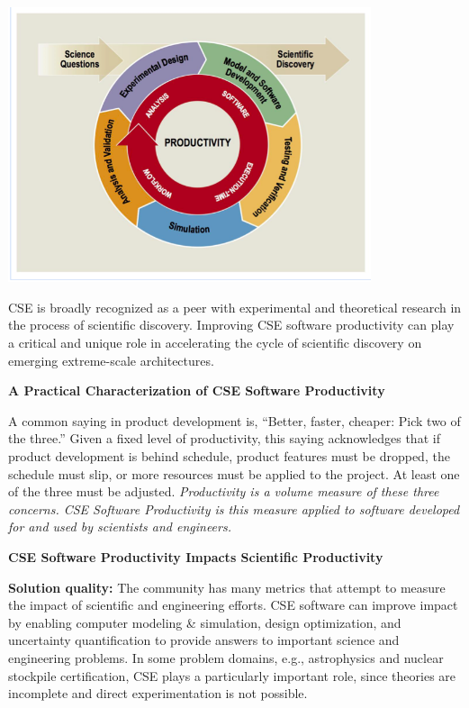 \documentclass[]{article}
\begin{document}
\begin{minipage}{0.7\textwidth}
\includegraphics[width=0.8\textwidth]{productivity}
\end{minipage}
\hfill
\begin{minipage}{0.3\textwidth}\raggedright
CSE is broadly recognized as a peer with experimental and theoretical
research in the process of scientific discovery. Improving CSE software
productivity can play a critical and unique role in accelerating the
cycle of scientific discovery on emerging extreme-scale architectures.
\end{minipage}

\textbf{A Practical Characterization of CSE Software
Productivity}

A common saying in product development is, ``Better, faster, cheaper:
Pick two of the three.'' Given a fixed level of productivity, this
saying acknowledges that if product development is behind schedule,
product features must be dropped, the schedule must slip, or more
resources must be applied to the project. At least one of the three must
be adjusted. \emph{Productivity is a volume measure of these three
concerns. CSE Software Productivity is this measure applied to software
developed for and used by scientists and engineers.}

\textbf{CSE Software Productivity Impacts Scientific
Productivity}

\textbf{Solution quality:} The community has many metrics that attempt
to measure the impact of scientific and engineering efforts. CSE
software can improve impact by enabling computer modeling \& simulation,
design optimization, and uncertainty quantification to provide answers
to important science and engineering problems. In some problem domains,
e.g., astrophysics and nuclear stockpile certification, CSE plays a
particularly important role, since theories are incomplete and direct
experimentation is not possible.
\end{document}
